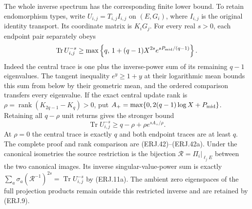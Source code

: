 
The whole inverse spectrum has the corresponding finite lower bound.
To retain endomorphism types, write
$U_{i,j}=T_{i,j}I_{i,j}$ on $(E,G_i)$, where $I_{i,j}$ is the
original identity transport. Its coordinate matrix is $K_iG_j$.
For every real $s>0$, each endpoint pair separately obeys
\[
 \operatorname{Tr}U_{i,j}^{-s}
 \ge\max\left\{q,\,
 1+(q-1)X^{2s}e^{sP_{\rm mid}/(q-1)}\right\}.
\]
Indeed the central trace is one plus the inverse-power sum of its
remaining $q-1$ eigenvalues. The tangent inequality $e^y\ge1+y$
at their logarithmic mean bounds this sum from below by their
geometric mean, and the ordered comparison transfers every eigenvalue.
If the exact central update rank is
$\rho=\operatorname{rank}(K_{2q-1}-K_q)>0$, put
$A_+=\max\{0,2(q-1)\log X+P_{\rm mid}\}$. Retaining all
$q-\rho$ unit returns gives the stronger bound
\[
 \operatorname{Tr}U_{i,j}^{-s}
 \ge q-\rho+\rho e^{sA_+/\rho}.
\]
At $\rho=0$ the central trace is exactly $q$ and both endpoint
traces are at least $q$. The complete proof and rank comparison are
(ERJ.42)--(ERJ.42a).
Under the canonical isometries the source restriction is the
bijection $\mathcal R=\Pi_i|_{\ell_jE}$ between the two canonical
images. Its inverse singular-value-power sum is exactly
$\sum_a\sigma_a(\mathcal R^{-1})^{2s}
=\operatorname{Tr}U_{i,j}^{-s}$ by (ERJ.11a).
The ambient zero eigenspaces of the full projection products remain
outside this restricted inverse and are retained by (ERJ.9).
